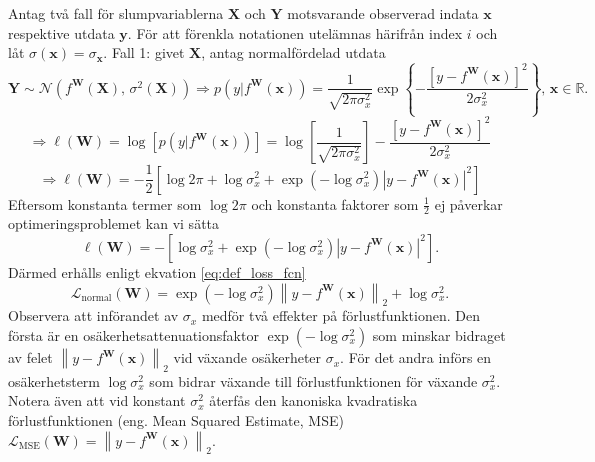 Antag två fall för slumpvariablerna $\mathbf{X}$ och $\mathbf{Y}$ motsvarande observerad indata $\mathbf{x}$ respektive utdata $\mathbf{y}$. För att förenkla notationen utelämnas härifrån index $i$ och låt $\sigma(\mathbf{x}) = \sigma_\mathbf{x}$. Fall 1: givet $\mathbf{X}$, antag normalfördelad utdata
\begin{equation}
     \mathbf{Y} \sim \mathcal{N}\left(f^\mathbf{W}(\mathbf{X}),\, \sigma^2(\mathbf{X})  \right) \Rightarrow p\left(y|f^\mathbf{W}(\mathbf{x})\right) = \frac{1}{\sqrt{2\pi\sigma^2_x}} \exp \left\{-\frac{\left[y - f^\mathbf{W}(\mathbf{x})\right]^2}{2\sigma^2_x}\right\},\, \mathbf{x} \in \mathbb{R}.
\end{equation}
\begin{equation}
   \Rightarrow \ell(\mathbf{W}) = \log \left[p\left(y|f^\mathbf{W}(\mathbf{x})\right)\right] = \log \left[ \frac{1}{\sqrt{2\pi\sigma^2_x}}\right] - \frac{\left[y - f^\mathbf{W}(\mathbf{x})\right]^2}{2\sigma^2_x}
\end{equation}
\begin{equation}
    \Rightarrow \ell(\mathbf{W}) = -\frac{1}{2} \left[\log 2\pi + \log \sigma_x^2 + \exp{\left(-\log \sigma_x^2 \right)} \left|y - f^\mathbf{W}(\mathbf{x})\right|^2 \right]
\label{eq:const_arg}
\end{equation}
Eftersom konstanta termer som $\log 2\pi$ och konstanta faktorer som $\frac{1}{2}$ ej påverkar optimeringsproblemet kan vi sätta
\begin{equation}
    \ell(\mathbf{W}) = -\left[\log \sigma_x^2 + \exp{\left(-\log \sigma_x^2 \right)} \left|y - f^\mathbf{W}(\mathbf{x})\right|^2 \right].
\end{equation}
Därmed erhålls enligt ekvation \eqref{eq:def_loss_fcn}
\begin{equation}
    \mathcal{L}_{\mathrm{normal}}(\mathbf{W}) = \exp{\left(-\log \sigma_x^2 \right)} \left\|y - f^\mathbf{W}(\mathbf{x})\right\|_2 + \log \sigma_x^2.
    \label{eq:normal_loss_fcn}
\end{equation}
Observera att införandet av $\sigma_x$ medför två effekter på förlustfunktionen. Den första är en osäkerhetsattenuationsfaktor $\exp{\left(-\log \sigma_x^2 \right)}$ som minskar bidraget av felet $\left\|y - f^\mathbf{W}(\mathbf{x})\right\|_2$ vid växande osäkerheter $\sigma_x$. För det andra införs en osäkerhetsterm $\log \sigma_x^2$ som bidrar växande till förlustfunktionen för växande $\sigma_x^2$. Notera även att vid konstant $\sigma_x^2$ återfås den kanoniska kvadratiska förlustfunktionen (eng. Mean Squared Estimate, MSE) $\mathcal{L}_\mathrm{MSE}(\mathbf{W}) = \left\|y - f^\mathbf{W}(\mathbf{x})\right\|_2$.

